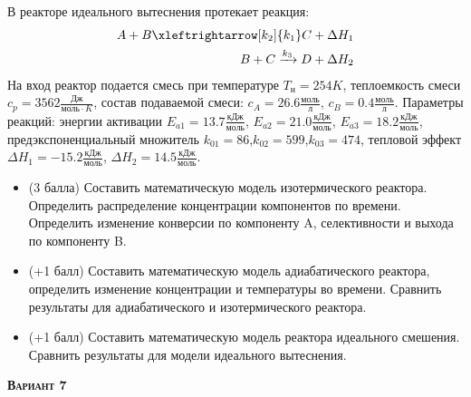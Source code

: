  В реакторе идеального вытеснения протекает реакция: \begin{equation*} \begin{aligned} A+B \xleftrightarrow[k_2]{k_1} C + \Delta H_1 \\ B + C \xrightarrow{k_3} D + \Delta H_2 \end{aligned} \end{equation*}                                На вход  реактор подается смесь при температуре $ T_н =  254 K$, теплоемкость смеси $c_p= 3562 \frac{Дж}{моль \cdot K}$, состав подаваемой смеси: $c_A=26.6 \frac{моль}{л}$, $c_B=0.4 \frac{моль}{л}$. Параметры реакций: энергии активации $E_{a1}=13.7 \frac{кДж}{моль}$, $E_{a2}=21.0  \frac{кДж}{моль}$, $E_{a3}=18.2  \frac{кДж}{моль}$, предэкспоненциальный множитель $k_{01}=        86$,$k_{02}=       599$,$k_{03}=       474$, тепловой эффект $\Delta H_1= -15.2  \frac{кДж}{моль}$, $\Delta H_2=14.5 \frac{кДж}{моль}$.\begin{itemize} \item (3 балла) Составить математическую модель изотермического реактора. Определить распределение концентрации компонентов по времени. Определить изменение конверсии по компоненту A, селективности и выхода по компоненту B. \item (+1 балл) Составить математическую модель адиабатического реактора, определить изменение концентрации и температуры во времени. Сравнить результаты для адиабатического и изотермического реактора. \item (+1 балл) Составить математическую модель реактора идеального смешения. Сравнить результаты для модели идеального вытеснения. \end{itemize}

\textsc{\textbf{Вариант 7}}

